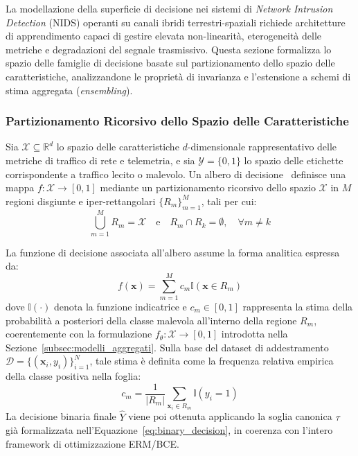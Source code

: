 La modellazione della superficie di decisione nei sistemi di \textit{Network Intrusion Detection} (NIDS) operanti su canali ibridi terrestri-spaziali richiede architetture di apprendimento capaci di gestire elevata non-linearità, eterogeneità delle metriche e degradazioni del segnale trasmissivo. Questa sezione formalizza lo spazio delle famiglie di decisione basate sul partizionamento dello spazio delle caratteristiche, analizzandone le proprietà di invarianza e l'estensione a schemi di stima aggregata (\textit{ensembling}).

\subsubsection{Partizionamento Ricorsivo dello Spazio delle Caratteristiche}
Sia $\mathcal{X} \subseteq \mathbb{R}^d$ lo spazio delle caratteristiche $d$-dimensionale rappresentativo delle metriche di traffico di rete e telemetria, e sia $\mathcal{Y} = \{0, 1\}$ lo spazio delle etichette corrispondente a traffico lecito o malevolo. Un albero di decisione~\cite{breiman1984} definisce una mappa $f: \mathcal{X} \to [0,1]$ mediante un partizionamento ricorsivo dello spazio $\mathcal{X}$ in $M$ regioni disgiunte e iper-rettangolari $\{R_m\}_{m=1}^M$, tali per cui:
\begin{equation}
    \bigcup_{m=1}^M R_m = \mathcal{X} \quad \text{e} \quad R_m \cap R_k = \emptyset, \quad \forall m \neq k
\end{equation}

La funzione di decisione associata all'albero assume la forma analitica espressa da:
\begin{equation}
    f(\mathbf{x}) = \sum_{m=1}^M c_m \mathbb{I}(\mathbf{x} \in R_m)
\end{equation}
dove $\mathbb{I}(\cdot)$ denota la funzione indicatrice e $c_m \in [0,1]$ rappresenta la stima della probabilità a posteriori della classe malevola all'interno della regione $R_m$, coerentemente con la formulazione $f_\theta: \mathcal{X} \to [0,1]$ introdotta nella Sezione~\ref{subsec:modelli_aggregati}. Sulla base del dataset di addestramento $\mathcal{D} = \{(\mathbf{x}_i, y_i)\}_{i=1}^N$, tale stima è definita come la frequenza relativa empirica della classe positiva nella foglia:
\begin{equation}
    c_m = \frac{1}{|R_m|} \sum_{\mathbf{x}_i \in R_m} \mathbb{I}(y_i = 1)
\end{equation}
La decisione binaria finale $\hat{Y}$ viene poi ottenuta applicando la soglia canonica $\tau$ già formalizzata nell'Equazione~\eqref{eq:binary_decision}, in coerenza con l'intero framework di ottimizzazione ERM/BCE.

